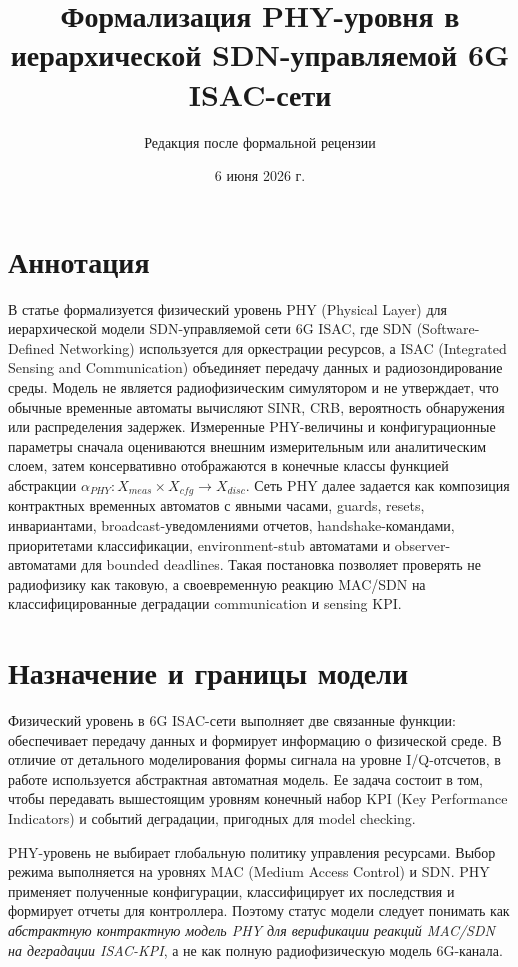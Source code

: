 \documentclass[10pt,a4paper]{article}
\title{Формализация PHY-уровня в иерархической SDN-управляемой 6G ISAC-сети}
\author{Редакция после формальной рецензии}
\date{6 июня 2026 г.}
\begin{document}
\maketitle

\section*{Аннотация}

В статье формализуется физический уровень PHY (Physical Layer) для иерархической модели SDN-управляемой сети 6G ISAC, где SDN (Software-Defined Networking) используется для оркестрации ресурсов, а ISAC (Integrated Sensing and Communication) объединяет передачу данных и радиозондирование среды. Модель не является радиофизическим симулятором и не утверждает, что обычные временные автоматы вычисляют SINR, CRB, вероятность обнаружения или распределения задержек. Измеренные PHY-величины и конфигурационные параметры сначала оцениваются внешним измерительным или аналитическим слоем, затем консервативно отображаются в конечные классы функцией абстракции \(\alpha_{PHY}:X_{meas}\times X_{cfg}\to X_{disc}\). Сеть PHY далее задается как композиция контрактных временных автоматов с явными часами, guards, resets, инвариантами, broadcast-уведомлениями отчетов, handshake-командами, приоритетами классификации, environment-stub автоматами и observer-автоматами для bounded deadlines. Такая постановка позволяет проверять не радиофизику как таковую, а своевременную реакцию MAC/SDN на классифицированные деградации communication и sensing KPI.

\section{Назначение и границы модели}

Физический уровень в 6G ISAC-сети выполняет две связанные функции: обеспечивает передачу данных и формирует информацию о физической среде. В отличие от детального моделирования формы сигнала на уровне I/Q-отсчетов, в работе используется абстрактная автоматная модель. Ее задача состоит в том, чтобы передавать вышестоящим уровням конечный набор KPI (Key Performance Indicators) и событий деградации, пригодных для model checking.

PHY-уровень не выбирает глобальную политику управления ресурсами. Выбор режима выполняется на уровнях MAC (Medium Access Control) и SDN. PHY применяет полученные конфигурации, классифицирует их последствия и формирует отчеты для контроллера. Поэтому статус модели следует понимать как \emph{абстрактную контрактную модель PHY для верификации реакций MAC/SDN на деградации ISAC-KPI}, а не как полную радиофизическую модель 6G-канала.
\end{document}

